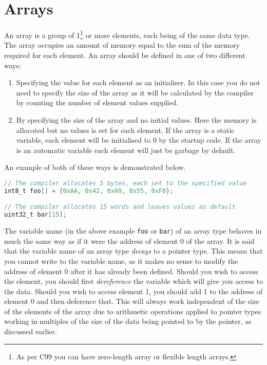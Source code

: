 \section{Arrays}
An array is a group of 1\footnote{As per C99 you can have zero-length array or flexible length arrays.} or more elements, each being of the same data type.
The array occupies an amount of memory equal to the sum of the memory required for each element. An array should be defined in one of two different ways:
\begin{enumerate}
    \item Specifying the value for each element as an initialiser. In this case you do not need to specify the size of the array as it will be calculated by the compiler by counting the number of element values supplied.
    \item By specifying the size of the array and no initial values. Here the memory is allocated but no values is set for each element. If the array is a static variable, each element will be initialised to 0 by the startup code. If the array is an automatic variable each element will just be garbage by default. 
\end{enumerate}

An example of both of these ways is demonstrated below.


\begin{lstlisting}[language=C]
// The compiler allocates 5 bytes, each set to the specified value
int8_t foo[] = {0xAA, 0x42, 0x69, 0x55, 0xF0};

// The compiler allocates 15 words and leaves values as default
uint32_t bar[15];
\end{lstlisting}

The variable name (in the above example \texttt{foo} or \texttt{bar}) of an array type behaves in much the same way as if it were the address of element 0 of the array. 
It is said that the variable name of an array type \emph{decays} to a pointer type.
This means that you cannot write to the variable name, as it makes no sense to modify the address of element 0 after it has already been defined. 
Should you wish to access the element, you should first \emph{dereference} the variable which will give you access to the data. 
Should you wish to access element 1, you should add 1 to the address of element 0 and then deference that. 
This will always work independent of the size of the elements of the array due to arithmetic operations applied to pointer types working in multiples of the size of the data being pointed to by the pointer, as discussed earlier.

